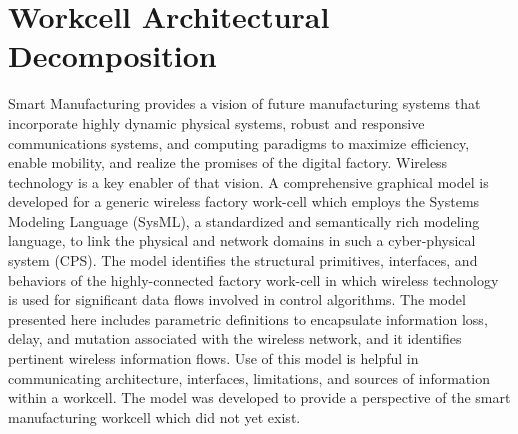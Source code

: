 
\chapter{Workcell Architectural Decomposition}\label{chapter:sysml}

\chapterintro*

Smart Manufacturing provides a vision of future manufacturing systems that incorporate highly dynamic physical systems, robust and responsive communications systems, and computing paradigms to maximize efficiency, enable mobility, and realize the promises of the digital factory.  Wireless technology is a key enabler of that vision. A comprehensive graphical model is developed for a generic wireless factory work-cell which employs the Systems Modeling Language (SysML), a standardized and semantically rich modeling language, to link the physical and network domains in such a cyber-physical system (CPS). The model identifies the structural primitives, interfaces, and behaviors of the highly-connected factory work-cell in which wireless technology is used for significant data flows involved in control algorithms. The model presented here includes parametric definitions to encapsulate information loss, delay, and mutation associated with the wireless network, and it identifies pertinent wireless information flows.  Use of this model is helpful in communicating architecture, interfaces, limitations, and sources of information within a workcell.  The model was developed to provide a perspective of the smart manufacturing workcell which did not yet exist.

